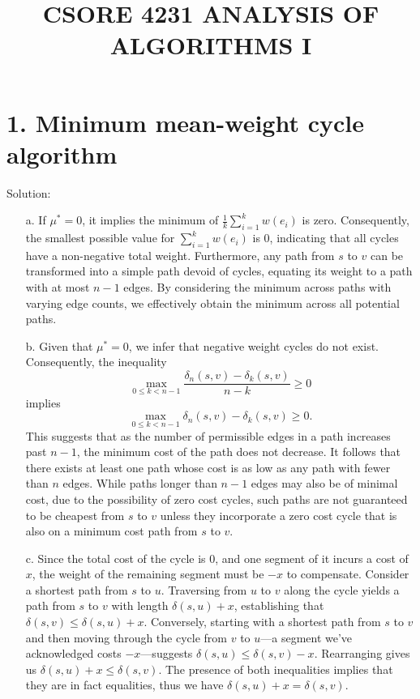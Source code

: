 \documentclass{article}
\title{CSORE 4231 ANALYSIS OF ALGORITHMS I \exerciseset}
\author{\studentname  \qquad \suid}
\begin{document}
\maketitle

\section*{1. Minimum mean-weight cycle algorithm}
Solution:
\begin{enumerate}
    \item[a.] If $\mu^* = 0$, it implies the minimum of $\frac{1}{k} \sum_{i=1}^{k} w(e_i)$ is zero. Consequently, the smallest possible value for $\sum_{i=1}^{k} w(e_i)$ is $0$, indicating that all cycles have a non-negative total weight. Furthermore, any path from $s$ to $v$ can be transformed into a simple path devoid of cycles, equating its weight to a path with at most $n - 1$ edges. By considering the minimum across paths with varying edge counts, we effectively obtain the minimum across all potential paths.

    
    \item[b.] Given that $\mu^* = 0$, we infer that negative weight cycles do not exist. Consequently, the inequality
    \[
    \max_{0 \leq k < n-1} \frac{\delta_n(s,v) - \delta_k(s,v)}{n - k} \geq 0
    \]
    implies
    \[
    \max_{0 \leq k < n-1} \delta_n(s,v) - \delta_k(s,v) \geq 0.
    \]
    This suggests that as the number of permissible edges in a path increases past $n - 1$, the minimum cost of the path does not decrease. It follows that there exists at least one path whose cost is as low as any path with fewer than $n$ edges. While paths longer than $n - 1$ edges may also be of minimal cost, due to the possibility of zero cost cycles, such paths are not guaranteed to be cheapest from $s$ to $v$ unless they incorporate a zero cost cycle that is also on a minimum cost path from $s$ to $v$.

    
    \item[c.] Since the total cost of the cycle is $0$, and one segment of it incurs a cost of $x$, the weight of the remaining segment must be $-x$ to compensate. Consider a shortest path from $s$ to $u$. Traversing from $u$ to $v$ along the cycle yields a path from $s$ to $v$ with length $\delta(s,u) + x$, establishing that $\delta(s,v) \leq \delta(s,u) + x$. Conversely, starting with a shortest path from $s$ to $v$ and then moving through the cycle from $v$ to $u$—a segment we've acknowledged costs $-x$—suggests $\delta(s,u) \leq \delta(s,v) - x$. Rearranging gives us $\delta(s,u) + x \leq \delta(s,v)$. The presence of both inequalities implies that they are in fact equalities, thus we have $\delta(s,u) + x = \delta(s,v)$.


\end{enumerate}
\end{document}
